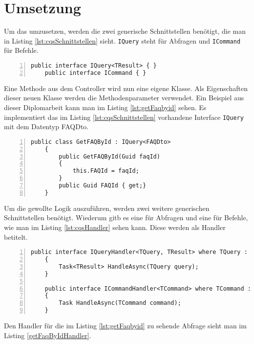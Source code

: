 \section{Umsetzung}
Um das umzusetzen, werden die zwei generische Schnittstellen benötigt, die man in Listing \ref{lst:cqsSchnittstellen} sieht. \texttt{IQuery} steht für Abfragen und \texttt{ICommand} für Befehle.
\begin{lstlisting}[caption={CQS-Schnittstellen},captionpos=b, numbers=left, backgroundcolor=\color{black!10},language={[Sharp]C}, label={lst:cqsSchnittstellen}]
	public interface IQuery<TResult> { }
	public interface ICommand { }
\end{lstlisting}
Eine Methode aus dem Controller wird nun eine eigene Klasse. Als Eigenschaften dieser neuen Klasse werden die Methodenparameter verwendet. Ein Beispiel aus dieser Diplomarbeit kann man im Listing \ref{lst:getFaqbyid} sehen. Es implementiert das im Listing \ref{lst:cqsSchnittstellen} vorhandene Interface \texttt{IQuery} mit dem Datentyp FAQDto.
\begin{lstlisting}[caption={CQS-Query Beispiel},captionpos=b, numbers=left, backgroundcolor=\color{black!10},language={[Sharp]C}, label={lst:getFaqbyid}]
	public class GetFAQById : IQuery<FAQDto>
	{
		public GetFAQById(Guid faqId)
		{
			this.FAQId = faqId;
		}
		public Guid FAQId { get;}
	}
\end{lstlisting}
Um die gewollte Logik auszuführen, werden zwei weitere generischen Schnittstellen benötigt. Wiederum gitb es eine für Abfragen und eine für Befehle, wie man im Listing \ref{lst:cqsHandler} sehen kann. Diese werden als Handler betitelt. \autocite{cqsSOLIDeArchitektur}
\begin{lstlisting}[caption={CQS-Handler},captionpos=b, numbers=left, backgroundcolor=\color{black!10},language={[Sharp]C}, label={lst:cqsHandler}]
	public interface IQueryHandler<TQuery, TResult>	where TQuery : IQuery<TResult>
	{
		Task<TResult> HandleAsync(TQuery query);
	}
	
	public interface ICommandHandler<TCommand> where TCommand : ICommand
	{
		Task HandleAsync(TCommand command);
	}
\end{lstlisting}
Den Handler für die im Listing \ref{lst:getFaqbyid} zu sehende Abfrage sieht man im Listing \ref{getFaqByIdHandler}.
